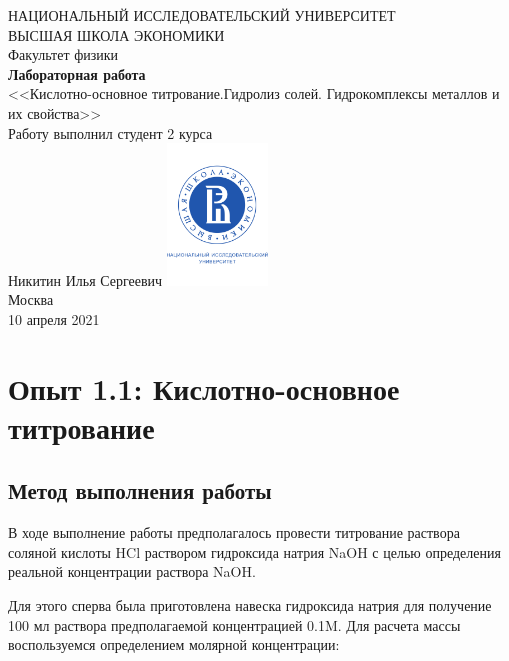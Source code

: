 \documentclass[a4paper, 12pt]{article}
\begin{document}
	\begin{titlepage}
		\begin{center}
			$$$$
			$$$$
			$$$$
			$$$$
			{\Large{НАЦИОНАЛЬНЫЙ ИССЛЕДОВАТЕЛЬСКИЙ УНИВЕРСИТЕТ}}\\
			\vspace{0.1cm}
			{\Large{ВЫСШАЯ ШКОЛА ЭКОНОМИКИ}}\\
			\vspace{0.25cm}
			{\large{Факультет физики}}\\
			\vspace{5.5cm}
			{\Huge\textbf{{Лабораторная работа}}}\\%
			\vspace{1cm}
			{\LARGE{<<Кислотно-основное титрование.Гидролиз солей. Гидрокомплексы металлов и их свойства>>}}\\%
			\vspace{2cm}
			{Работу выполнил студент 2 курса}\\
			{Никитин Илья Сергеевич}
			\vfill
			\includegraphics[width = 0.2\textwidth]{HSElogo}\\
			\vfill
			Москва\\
			10 апреля 2021
		\end{center}
	\end{titlepage}

\tableofcontents

\newpage
\section{Опыт 1.1: Кислотно-основное титрование}
\subsection{Метод выполнения работы}

В ходе выполнение работы предполагалось провести титрование раствора соляной кислоты HCl раствором гидроксида натрия NaOH с целью определения реальной концентрации раствора NaOH.

Для этого сперва была приготовлена навеска гидроксида натрия для получение 100 мл раствора предполагаемой концентрацией 0.1M. Для расчета массы воспользуемся определением молярной концентрации:
\end{document}
